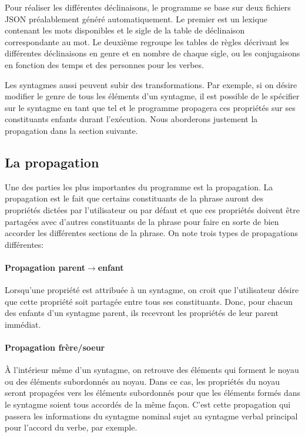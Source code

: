 \documentclass[11pt]{article} %
\begin{document}
Pour réaliser les différentes déclinaisons, le programme se base sur
deux fichiers JSON préalablement généré automatiquement. Le premier
est un lexique contenant les mots disponibles et le sigle de la table
de déclinaison correspondante au mot. Le deuxième regroupe les tables
de règles décrivant les différentes déclinaisons en genre et en nombre
de chaque sigle, ou les conjugaisons en fonction des temps et des
personnes pour les verbes.

Les syntagmes aussi peuvent subir des transformations. Par exemple,
si on désire modifier le genre de tous les éléments d'un syntagme,
il est possible de le spécifier sur le syntagme en tant que tel et
le programme propagera ces propriétés sur ses constituants enfants
durant l'exécution. Nous aborderons justement la propagation dans
la section suivante.

\subsection{La propagation}

Une des parties les plus importantes du programme est la propagation.
La propagation est le fait que certains constituants de la phrase
auront des propriétés dictées par l'utilisateur ou par défaut et que
ces propriétés doivent être partagées avec d'autres constituants de
la phrase pour faire en sorte de bien accorder les différentes sections
de la phrase. On note trois types de propagations différentes:

\paragraph{Propagation parent$\rightarrow$enfant}

Lorsqu'une propriété est attribuée à un syntagme, on croit que l'utilisateur
désire que cette propriété soit partagée entre tous ses constituants.
Donc, pour chacun des enfants d'un syntagme parent, ils recevront
les propriétés de leur parent immédiat.

\paragraph{Propagation frère/soeur}

À l'intérieur même d'un syntagme, on retrouve des éléments qui forment
le noyau ou des éléments subordonnés au noyau. Dans ce cas, les propriétés
du noyau seront propagées vers les éléments subordonnés pour que les
éléments formés dans le syntagme soient tous accordés de la même façon.
C'est cette propagation qui passera les informations du syntagme nominal
sujet au syntagme verbal principal pour l'accord du verbe, par exemple. 
\end{document}
